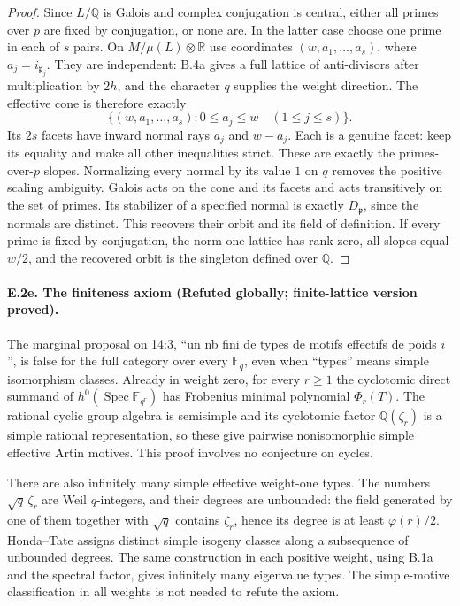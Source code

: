 \begin{proof}
Since $L/\mathbb Q$ is Galois and complex conjugation is central,
either all primes over $p$ are fixed by conjugation, or none are.
In the latter case choose one prime in each of $s$ pairs. On
$M/\mu(L)\otimes\mathbb R$ use coordinates
$(w,a_1,\ldots,a_s)$, where $a_j=i_{\mathfrak p_j}$.
They are independent: B.4a gives a full lattice of anti-divisors
after multiplication by $2h$, and the character $q$ supplies the
weight direction. The effective cone is therefore exactly
\[
 \{(w,a_1,\ldots,a_s):0\leq a_j\leq w\quad(1\leq j\leq s)\}.
\]
Its $2s$ facets have inward normal rays $a_j$ and $w-a_j$.
Each is a genuine facet: keep its equality and make all other
inequalities strict. These are exactly the primes-over-$p$ slopes.
Normalizing every normal by its value $1$ on $q$ removes the positive
scaling ambiguity. Galois acts on the cone and its facets and acts
transitively on the set of primes. Its stabilizer of a specified
normal is exactly $D_{\mathfrak p}$, since the normals are distinct.
This recovers their orbit and its field of definition. If every
prime is fixed by conjugation, the norm-one lattice has rank zero,
all slopes equal $w/2$, and the recovered orbit is the singleton
defined over $\mathbb Q$.
\end{proof}

\paragraph{E.2e. The finiteness axiom (Refuted globally; finite-lattice
version proved).}
\label{E2e}
The marginal proposal on 14:3, ``un nb fini de types de motifs
effectifs de poids $i$'', is false for the full category over every
$\mathbb F_q$, even when ``types'' means simple isomorphism classes.
Already in weight zero, for every $r\geq1$ the cyclotomic direct
summand of $h^0(\operatorname{Spec}\mathbb F_{q^r})$ has Frobenius
minimal polynomial $\Phi_r(T)$. The rational cyclic group algebra
is semisimple and its cyclotomic factor $\mathbb Q(\zeta_r)$ is a
simple rational representation, so these give pairwise nonisomorphic
simple effective Artin motives. This proof involves no conjecture
on cycles.

There are also infinitely many simple effective weight-one types.
The numbers $\sqrt q\,\zeta_r$ are Weil $q$-integers, and their
degrees are unbounded: the field generated by one of them together
with $\sqrt q$ contains $\zeta_r$, hence its degree is at least
$\varphi(r)/2$. Honda--Tate assigns distinct simple isogeny classes
along a subsequence of unbounded degrees. The same construction in
each positive weight, using B.1a and the spectral factor, gives
infinitely many eigenvalue types. The simple-motive classification
in all weights is not needed to refute the axiom.

